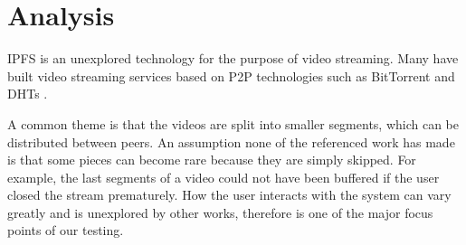 \chapter{Analysis}
\label{cha:analysis}

\acs{IPFS} is an unexplored technology for the purpose of video streaming. Many have built video streaming services based on \acs{P2P} technologies such as BitTorrent and \acs{DHT}s \cite{gazdar2017toward}.

A common theme is that the videos are split into smaller segments, which can be distributed between peers. An assumption none of the referenced work has made is that some pieces can become rare because they are simply skipped. For example, the last segments of a video could not have been buffered if the user closed the stream prematurely. How the user interacts with the system can vary greatly and is unexplored by other works, therefore is one of the major focus points of our testing.

